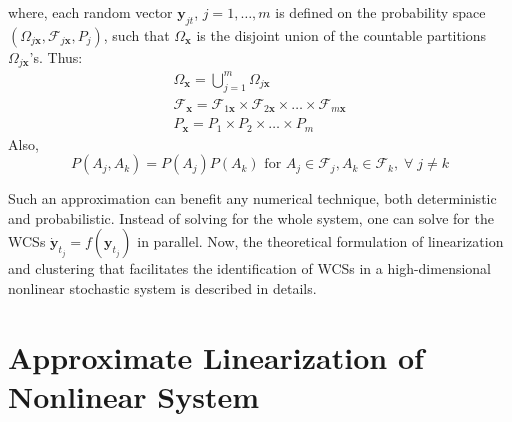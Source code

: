\noindent where, each random vector $\mathbf{y}_{jt}$, $j = 1,\ldots,m$ is defined on the probability space $(\Omega_{j \textbf{x}},\mathcal{F}_{j \textbf{x}},P_j)$, such that $\Omega_{\textbf{x}}$ is the disjoint union of the countable partitions $\Omega_{j \textbf{x}}$'s. Thus: 
\begin{equation}
\begin{array}{l}
\Omega_{\textbf{x}} =  \displaystyle \bigcup_{j=1}^m \Omega_{j \textbf{x}}  \\
\mathcal{F}_{\textbf{x}} = \mathcal{F}_{1\textbf{x}} \times \mathcal{F}_{2 \textbf{x}} \times \ldots \times \mathcal{F}_{m \textbf{x}} \\
P_{\textbf{x}} = P_1 \times P_2 \times \ldots \times P_m
\end{array}
\end{equation}
Also,
\begin{equation}
P(A_j,A_k) = P(A_j)P(A_k) \text{ for } A_j \in \mathcal{F}_j,A_k \in \mathcal{F}_k, \;\forall \; j \neq k
\end{equation}

Such an approximation can benefit any numerical technique, both deterministic and probabilistic. Instead of solving for the whole system, one can solve for the WCSs $\dot{\mathbf{y}}_{t_j} = f(\mathbf{y}_{t_j})$ in parallel. Now, the theoretical formulation of linearization and clustering that facilitates the identification of WCSs in a high-dimensional nonlinear stochastic system is described in details. 

\section{Approximate Linearization of Nonlinear System}
\label{wcs:linearization}

